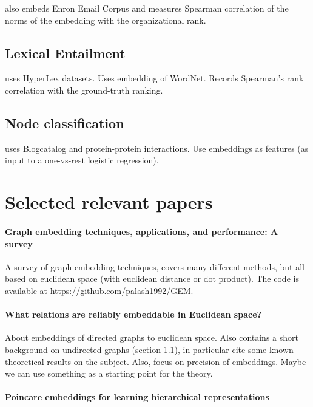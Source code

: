 \documentclass{article}
\begin{document}
\cite{nickel2018learning} also embeds Enron Email Corpus and measures Spearman correlation of the norms of the embedding with
the organizational rank.

 
\subsection{Lexical Entailment}

\cite{nickel2017poincare} uses HyperLex datasets. Uses embedding of WordNet. Records Spearman’s rank correlation
with the ground-truth ranking. 

\subsection{Node classification}

\cite{goyal2018graph} uses Blogcatalog and protein-protein interactions. Use embeddings as features (as input to a one-vs-rest logistic regression).

\section{Selected relevant papers}

\paragraph{Graph embedding techniques, applications, and performance: A survey~\cite{goyal2018graph}}

A survey of graph embedding techniques, covers many different methods, but all based on euclidean space (with euclidean distance or dot product). The code is available at \url{https://github.com/palash1992/GEM}.

\paragraph{What relations are reliably embeddable in Euclidean space?~\cite{bhattacharjee2019relations}}

About embeddings of directed graphs to euclidean space. Also contains a short background on undirected graphs (section 1.1), in particular cite some known theoretical results on the subject. Also, focus on precision of embeddings. Maybe we can use something as a starting point for the theory. 

\paragraph{Poincare embeddings for learning hierarchical representations~\cite{nickel2017poincare}}
\end{document}

